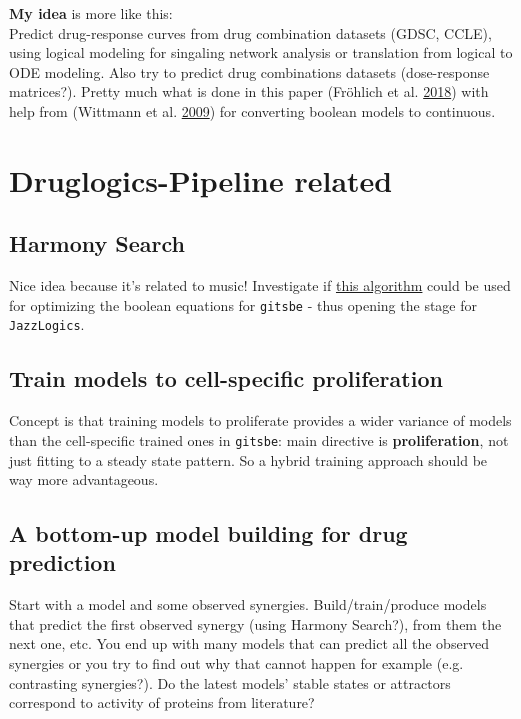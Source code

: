 \documentclass[
  12pt,
]{book}
\begin{document}
\textbf{My idea} is more like this:\\
Predict drug-response curves from drug combination datasets (GDSC, CCLE),
using logical modeling for singaling network analysis or translation from
logical to ODE modeling. Also try to predict drug combinations datasets
(dose-response matrices?). Pretty much what is done in this paper (Fröhlich et al. \protect\hyperlink{ref-Frohlich2018}{2018})
with help from (Wittmann et al. \protect\hyperlink{ref-Wittmann2009}{2009}) for converting boolean models to continuous.

\hypertarget{druglogics-pipeline-related}{%
\section{Druglogics-Pipeline related}\label{druglogics-pipeline-related}}

\hypertarget{harmony-search}{%
\subsection{Harmony Search}\label{harmony-search}}

Nice idea because it's related to music!
Investigate if \href{https://doi.org/10.1016/j.proeng.2016.07.510}{this algorithm}
could be used for optimizing the boolean equations for \texttt{gitsbe} - thus opening the
stage for \texttt{JazzLogics}.

\hypertarget{train-models-to-cell-specific-proliferation}{%
\subsection{Train models to cell-specific proliferation}\label{train-models-to-cell-specific-proliferation}}

Concept is that training models to proliferate provides a wider variance of models than the
cell-specific trained ones in \texttt{gitsbe}: main directive is \textbf{proliferation},
not just fitting to a steady state pattern. So a hybrid training approach should
be way more advantageous.

\hypertarget{a-bottom-up-model-building-for-drug-prediction}{%
\subsection{A bottom-up model building for drug prediction}\label{a-bottom-up-model-building-for-drug-prediction}}

Start with a model and some observed synergies. Build/train/produce models that
predict the first observed synergy (using Harmony Search?), from them the next
one, etc. You end up with many models that can predict all the observed
synergies or you try to find out why that cannot happen for example (e.g.~
contrasting synergies?). Do the latest models' stable states or attractors
correspond to activity of proteins from literature?
\end{document}
